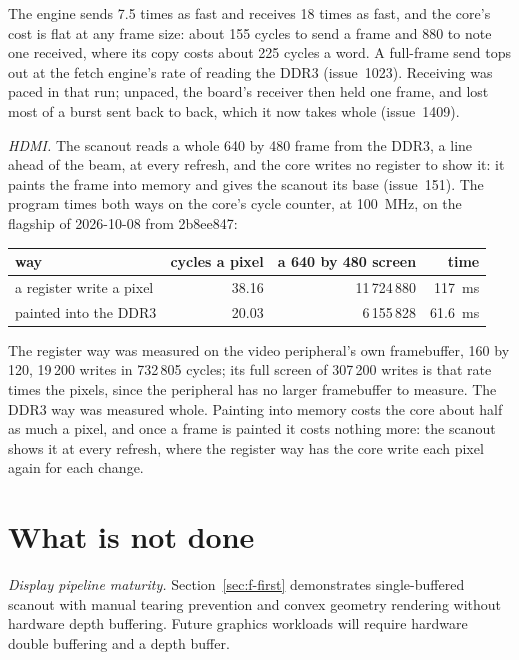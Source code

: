 \documentclass[journal,9pt]{IEEEtran}
\begin{document}
\noindent The engine sends 7.5 times as fast and receives 18 times as
fast, and the core's cost is flat at any frame size: about 155 cycles
to send a frame and 880 to note one received, where its copy costs
about 225 cycles a word. A full-frame send tops out at the fetch
engine's rate of reading the DDR3 (issue~1023). Receiving was paced in
that run; unpaced, the board's receiver then held one frame, and lost
most of a burst sent back to back, which it now takes whole
(issue~1409).

\emph{HDMI.} The scanout reads a whole 640 by 480 frame from the DDR3,
a line ahead of the beam, at every refresh, and the core writes no
register to show it: it paints the frame into memory and gives the
scanout its base (issue~151). The program  times both
ways on the core's cycle counter, at 100~MHz, on the flagship of
2026-10-08 from  2b8ee847:

\begin{center}\footnotesize
\begin{tabular}{@{}lrrr@{}}
\toprule
way & cycles a pixel & a 640 by 480 screen & time \\
\midrule
a register write a pixel & 38.16 & 11\,724\,880 & 117~ms \\
painted into the DDR3 & 20.03 & 6\,155\,828 & 61.6~ms \\
\bottomrule
\end{tabular}
\end{center}

\noindent The register way was measured on the video peripheral's own
framebuffer, 160 by 120, 19\,200 writes in 732\,805 cycles; its full
screen of 307\,200 writes is that rate times the pixels, since the
peripheral has no larger framebuffer to measure. The DDR3 way was
measured whole. Painting into memory costs the core about half as
much a pixel, and once a frame is painted it costs nothing more: the
scanout shows it at every refresh, where the register way has the
core write each pixel again for each change.

\section{What is not done}
\label{sec:f-todo}

\emph{Display pipeline maturity.} Section~\ref{sec:f-first} demonstrates
single-buffered scanout with manual tearing prevention and convex geometry
rendering without hardware depth buffering. Future graphics workloads will
require hardware double buffering and a depth buffer.
\end{document}
